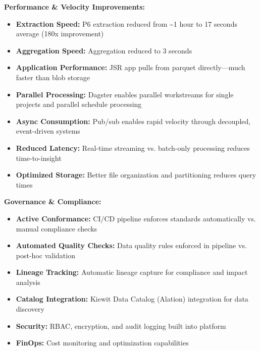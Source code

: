 \documentclass[10pt, a4paper]{article}
\begin{document}
{\vspace{0.15em}

\hspace{1em}\textbf{Performance \& Velocity Improvements:}
\begin{itemize}[leftmargin=2.5em, itemsep=0.05em]
    \item \textbf{Extraction Speed:} P6 extraction reduced from \textasciitilde1 hour to 17 seconds average (180x improvement)
    \item \textbf{Aggregation Speed:} Aggregation reduced to 3 seconds
    \item \textbf{Application Performance:} JSR app pulls from parquet directly---much faster than blob storage
    \item \textbf{Parallel Processing:} Dagster enables parallel workstreams for single projects and parallel schedule processing
    \item \textbf{Async Consumption:} Pub/sub enables rapid velocity through decoupled, event-driven systems
    \item \textbf{Reduced Latency:} Real-time streaming vs. batch-only processing reduces time-to-insight
    \item \textbf{Optimized Storage:} Better file organization and partitioning reduces query times
\end{itemize}

\vspace{0.15em}

\hspace{1em}\textbf{Governance \& Compliance:}
\begin{itemize}[leftmargin=2.5em, itemsep=0.05em]
    \item \textbf{Active Conformance:} CI/CD pipeline enforces standards automatically vs. manual compliance checks
    \item \textbf{Automated Quality Checks:} Data quality rules enforced in pipeline vs. post-hoc validation
    \item \textbf{Lineage Tracking:} Automatic lineage capture for compliance and impact analysis
    \item \textbf{Catalog Integration:} Kiewit Data Catalog (Alation) integration for data discovery
    \item \textbf{Security:} RBAC, encryption, and audit logging built into platform
    \item \textbf{FinOps:} Cost monitoring and optimization capabilities
\end{itemize}

}
\end{document}
